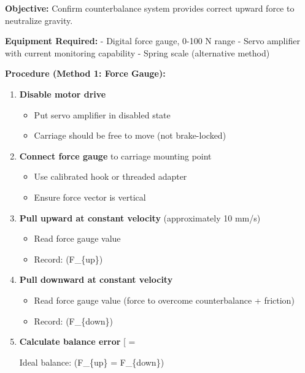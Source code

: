 \documentclass[
]{article}
\providecommand{\tightlist}{%
  \setlength{\itemsep}{0pt}\setlength{\parskip}{0pt}}
\begin{document}
\textbf{Objective:} Confirm counterbalance system provides correct
upward force to neutralize gravity.

\textbf{Equipment Required:} - Digital force gauge, 0-100 N range -
Servo amplifier with current monitoring capability - Spring scale
(alternative method)

\textbf{Procedure (Method 1: Force Gauge):}

\begin{enumerate}
\def\labelenumi{\arabic{enumi}.}
\item
  \textbf{Disable motor drive}

  \begin{itemize}
  \tightlist
  \item
    Put servo amplifier in disabled state
  \item
    Carriage should be free to move (not brake-locked)
  \end{itemize}
\item
  \textbf{Connect force gauge} to carriage mounting point

  \begin{itemize}
  \tightlist
  \item
    Use calibrated hook or threaded adapter
  \item
    Ensure force vector is vertical
  \end{itemize}
\item
  \textbf{Pull upward at constant velocity} (approximately 10 mm/s)

  \begin{itemize}
  \tightlist
  \item
    Read force gauge value
  \item
    Record: (F\_\{up\})
  \end{itemize}
\item
  \textbf{Pull downward at constant velocity}

  \begin{itemize}
  \tightlist
  \item
    Read force gauge value (force to overcome counterbalance + friction)
  \item
    Record: (F\_\{down\})
  \end{itemize}
\item
  \textbf{Calculate balance error} {[} =
  \frac{F_{up} - F_{down}}{2}{]}

  Ideal balance: (F\_\{up\} = F\_\{down\})
\end{enumerate}
\end{document}
